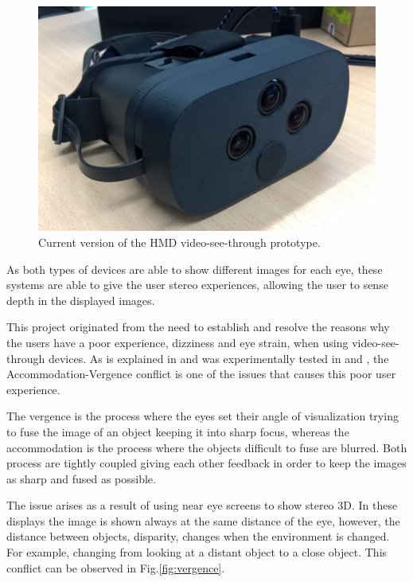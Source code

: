 \documentclass[10pt,a4paper,twocolumn,twoside]{article}
\begin{document}
	\begin{figure}
		\centering
		\includegraphics[width=1\linewidth]{img/imagenproto3.jpg}
		\caption{Current version of the HMD video-see-through prototype.}
		\label{fig:proto}
	\end{figure}
	
	As both types of devices are able to show different images for each eye, these systems are able to give the user stereo experiences, allowing the user to sense depth in the displayed images. 
	
	This project originated from the need to establish and resolve the reasons why the users have a poor experience, dizziness and eye strain, when using video-see-through devices. As is explained in \cite{disconfortReview} and was experimentally tested in \cite{vergenceDisconfort} and \cite{shiomiaccomodation}, the Accommodation-Vergence conflict is one of the issues that causes this poor user experience.
	
	The vergence is the process where the eyes set their angle of visualization trying to fuse the image of an object keeping it into sharp focus, whereas the accommodation is the process where the objects difficult to fuse are blurred. Both process are tightly coupled giving each other feedback in order to keep the images as sharp and fused as possible. 
	
	The issue arises as a result of using near eye screens to show stereo 3D. In these displays the image is shown always at the same distance of the eye, however, the distance between objects, disparity,  changes when the environment is changed. For example, changing from looking at a distant object to a close object.  This conflict can be observed in Fig.\ref{fig:vergence}.
	
\end{document}
